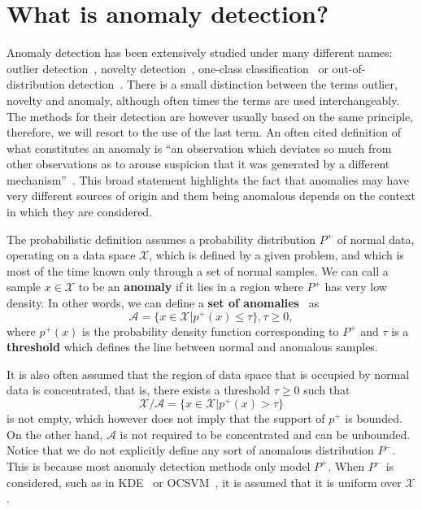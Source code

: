 \section{What is anomaly detection?}
Anomaly detection has been extensively studied under many different names: outlier detection~\cite{knorr98algorithms,hodge2004survey}, novelty detection~\cite{pimentel2014review}, one-class classification~\cite{ruff2018deep} or out-of-distribution detection~\cite{liang2017enhancing}. There is a small distinction between the terms outlier, novelty and anomaly, although often times the terms are used interchangeably. The methods for their detection are however usually based on the same principle, therefore, we will resort to the use of the last term. An often cited definition of what constitutes an anomaly is ``an observation which deviates so much from other observations as to arouse suspicion that it was generated by a different mechanism''~\cite{barnett1974outliers}. This broad statement highlights the fact that anomalies may have very different sources of origin and them being anomalous depends on the context in which they are considered. 

The probabilistic definition assumes a probability distribution $P^+$ of normal data, operating on a data space $\mathcal{X}$, which is defined by a given problem, and which is most of the time known only through a set of normal samples. We can call a sample $x \in \mathcal{X}$ to be an \textbf{anomaly} if it lies in a region where $P^+$ has very low density. In other words, we can define a \textbf{set of anomalies}~\cite{ruff2020unifying} as 
\begin{equation} \label{eq:anomaly_set}
	\mathcal{A} = \lbrace x \in \mathcal{X} \vert p^+(x) \leq \tau \rbrace, \tau \geq 0,
\end{equation}
where $p^+(x)$ is the probability density function corresponding to $P^+$ and $\tau$ is a \textbf{threshold} which defines the line between normal and anomalous samples. 

It is also often assumed that the region of data space that is occupied by normal data is concentrated, that is, there exists a threshold $\tau \geq 0$ such that
\begin{equation} \label{eq:anomaly_set}
	\mathcal{X} \slash \mathcal{A} = \lbrace x \in \mathcal{X} \vert p^+(x) > \tau \rbrace
\end{equation}
is not empty, which however does not imply that the support of $p^+$ is bounded. On the other hand, $\mathcal{A}$ is not required to be concentrated and can be unbounded. Notice that we do not explicitly define any sort of anomalous distribution $P^-$. This is because most anomaly detection methods only model $P^+$. When $P^-$ is considered, such as in KDE~\cite{parzen1962estimation} or OCSVM~\cite{scholkopf2001estimating}, it is assumed that it is uniform over $\mathcal{X}$. 

